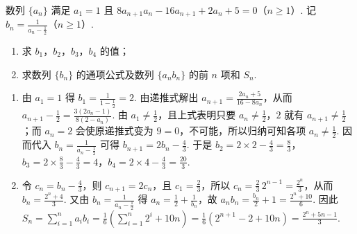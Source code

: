 \begin{problem}
数列 \(\{a_{n}\}\) 满足 \(a_1 = 1\) 且 \(8a_{n + 1}a_n - 16a_{n + 1} + 2a_n + 5 = 0\)（\(n \geqslant 1\)）. 记 \(b_{n} = \frac{1}{a_{n} - \frac{1}{2}}\)（\(n \geqslant 1\)）.

\begin{enumerate}
\item 求 \(b_{1}\)，\(b_{2}\)，\(b_{3}\)，\(b_{4}\) 的值；
\item 求数列 \(\{b_n\}\) 的通项公式及数列 \(\{a_n b_n\}\) 的前 \(n\) 项和 \(S_n\).
\end{enumerate}

\begin{solution}
\begin{enumerate}
\item 由 \(a_1=1\) 得 \(b_1=\frac1{1-\frac12}=2\). 由递推式解出 \(a_{n+1}=\frac{2a_n+5}{16-8a_n}\)，从而 \(a_{n+1}-\frac12=\frac{3(2a_n-1)}{8(2-a_n)}\). 由 \(a_1\neq\frac12\)，且上式表明只要 \(a_n\neq\frac12\)，\(2\) 就有 \(a_{n+1}\neq\frac12\)；而 \(a_n=2\) 会使原递推式变为 \(9=0\)，不可能，所以归纳可知各项 \(a_n\neq\frac12\). 因而代入 \(b_n=\frac1{a_n-\frac12}\) 可得 \(b_{n+1}=2b_n-\frac43\). 于是 \(b_2=2\times2-\frac43=\frac83\)，\(b_3=2\times\frac83-\frac43=4\)，\(b_4=2\times4-\frac43=\frac{20}{3}\).
\item 令 \(c_n=b_n-\frac43\)，则 \(c_{n+1}=2c_n\)，且 \(c_1=\frac23\)，所以 \(c_n=\frac23\,2^{n-1}=\frac{2^n}{3}\)，从而 \(b_n=\frac{2^n+4}{3}\). 又由 \(b_n=\frac1{a_n-\frac12}\) 得 \(a_n=\frac12+\frac1{b_n}\)，故 \(a_nb_n=\frac{b_n}{2}+1=\frac{2^n+10}{6}\). 因此 \(S_n=\sum_{i=1}^n a_ib_i=\frac16\left(\sum_{i=1}^n2^i+10n\right)=\frac16\left(2^{n+1}-2+10n\right)=\frac{2^n+5n-1}{3}\).
\end{enumerate}
\end{solution}
\end{problem}
